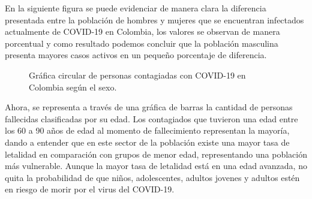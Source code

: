 \documentclass[conference,compsoc,onecolumn]{IEEEtran}
\begin{document}
En la siguiente figura se puede evidenciar de manera clara la diferencia presentada entre la población de hombres y mujeres que se encuentran infectados actualmente de COVID-19 en Colombia, los valores se observan de manera porcentual y como resultado podemos concluir que la población masculina presenta mayores casos activos en un pequeño porcentaje de diferencia.\\

\begin{figure}[htbp]
\centering
{}
\caption{Gráfica circular de personas contagiadas con COVID-19 en Colombia según el sexo.} \label{fig:lego}
\end{figure}

Ahora, se representa a través de una gráfica de barras la cantidad de personas fallecidas clasificadas por su edad. Los contagiados que tuvieron una edad entre los 60 a 90 años de edad al momento de fallecimiento representan la mayoría, dando a entender que en este sector de la población existe una mayor tasa de letalidad en comparación con grupos de menor edad, representando una población más vulnerable. Aunque la mayor tasa de letalidad está en una edad avanzada, no quita la probabilidad de que niños, adolescentes, adultos jovenes y adultos estén en riesgo de morir por el virus del COVID-19.\\
\end{document}
